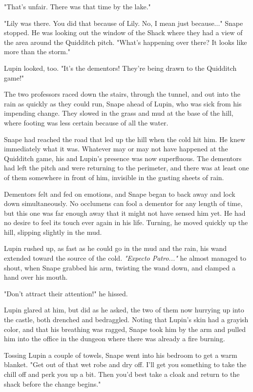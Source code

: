 \documentclass[a4paper,11pt]{article}
\begin{document}
"That's unfair. There was that time by the lake."

"Lily was there. You did that because of Lily. No, I mean just because..." Snape stopped. He was looking out the window of the Shack where they had a view of the area around the Quidditch pitch. "What's happening over there? It looks like more than the storm."

Lupin looked, too. "It's the dementors! They're being drawn to the Quidditch game!"

The two professors raced down the stairs, through the tunnel, and out into the rain as quickly as they could run, Snape ahead of Lupin, who was sick from his impending change. They slowed in the grass and mud at the base of the hill, where footing was less certain because of all the water.

Snape had reached the road that led up the hill when the cold hit him. He knew immediately what it was. Whatever may or may not have happened at the Quidditch game, his and Lupin's presence was now superfluous. The dementors had left the pitch and were returning to the perimeter, and there was at least one of them somewhere in front of him, invisible in the gusting sheets of rain.

Dementors felt and fed on emotions, and Snape began to back away and lock down simultaneously. No occlumens can fool a dementor for any length of time, but this one was far enough away that it might not have sensed him yet. He had no desire to feel its touch ever again in his life. Turning, he moved quickly up the hill, slipping slightly in the mud.

Lupin rushed up, as fast as he could go in the mud and the rain, his wand extended toward the source of the cold. \emph{"Expecto Patro..."} he almost managed to shout, when Snape grabbed his arm, twisting the wand down, and clamped a hand over his mouth.

"Don't attract their attention!" he hissed.

Lupin glared at him, but did as he asked, the two of them now hurrying up into the castle, both drenched and bedraggled. Noting that Lupin's skin had a grayish color, and that his breathing was ragged, Snape took him by the arm and pulled him into the office in the dungeon where there was already a fire burning.

Tossing Lupin a couple of towels, Snape went into his bedroom to get a warm blanket. "Get out of that wet robe and dry off. I'll get you something to take the chill off and perk you up a bit. Then you'd best take a cloak and return to the shack before the change begins."
\end{document}

